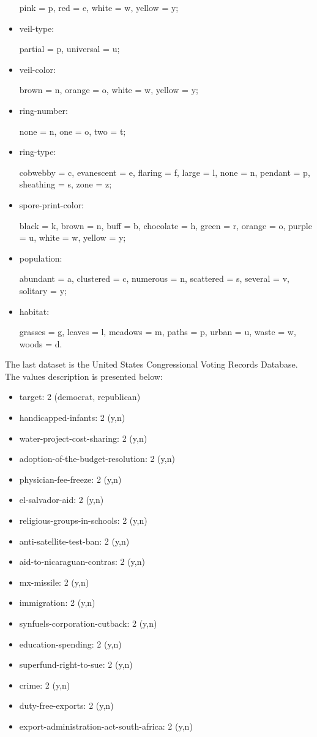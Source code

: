 \documentclass[12pt]{report}
\begin{document}
\begin{itemize}
  pink = p, red = e, white = w, yellow = y;
  \item veil-type:     \par            partial = p, universal = u;
  \item veil-color:    \par            brown = n, orange = o, white = w, yellow = y;
  \item ring-number:    \par           none = n, one = o, two = t;
  \item ring-type:      \par           cobwebby = c, evanescent = e, flaring = f, large = l, 
  none = n, pendant = p, sheathing = s, zone = z;
  \item spore-print-color:  \par       black = k, brown = n, buff = b, chocolate = h, green = r, 
  orange = o, purple = u, white = w, yellow = y;
  \item population:      \par          abundant = a, clustered = c, numerous = n, 
  scattered = s, several = v, solitary = y;
  \item habitat:       \par            grasses = g, leaves = l, meadows = m, paths = p, 
  urban = u, waste = w, woods = d.
\end{itemize}
The last dataset is the United States Congressional Voting Records Database. The values description is presented below:
\begin{multicols}{2}
  \begin{itemize}
    \item target: 2 (democrat, republican)
    \item handicapped-infants: 2 (y,n)
    \item water-project-cost-sharing: 2 (y,n)
    \item adoption-of-the-budget-resolution: 2 (y,n)
    \item physician-fee-freeze: 2 (y,n)
    \item el-salvador-aid: 2 (y,n)
    \item religious-groups-in-schools: 2 (y,n)
    \item anti-satellite-test-ban: 2 (y,n)
    \item aid-to-nicaraguan-contras: 2 (y,n)
    \item mx-missile: 2 (y,n)
    \item immigration: 2 (y,n)
    \item synfuels-corporation-cutback: 2 (y,n)
    \item education-spending: 2 (y,n)
    \item superfund-right-to-sue: 2 (y,n)
    \item crime: 2 (y,n)
    \item duty-free-exports: 2 (y,n)
    \item export-administration-act-south-africa: 2 (y,n)
  \end{itemize}
\end{multicols}
\end{document}

